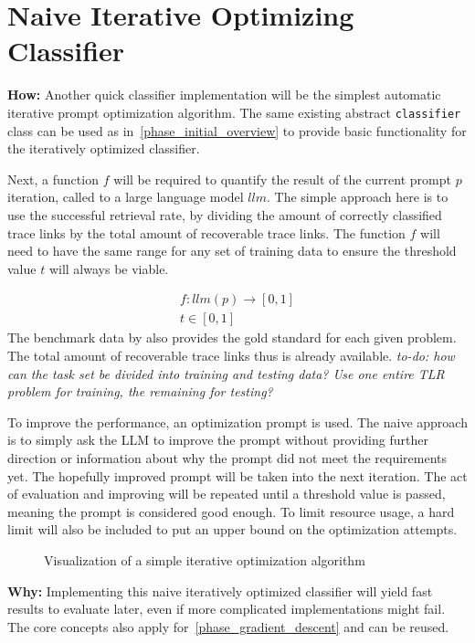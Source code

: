 \section{Naive Iterative Optimizing Classifier}
\label{approach:sec:naive_iterative}
\textbf{How:} Another quick classifier implementation will be the simplest automatic iterative prompt optimization algorithm. The same existing abstract \verb|classifier| class can be used as in~\ref{phase_initial_overview} to provide basic functionality for the iteratively optimized classifier.

Next, a function $f$ will be required to quantify the result of the current prompt $p$ iteration, called to a large language model $llm$. The simple approach here is to use the successful retrieval rate, by dividing the amount of correctly classified trace links by the total amount of recoverable trace links.
The function $f$ will need to have the same range for any set of training data to ensure the threshold value $t$ will always be viable.


\begin{align*} 
f: llm(p) \rightarrow [0, 1] \\
t \in [0, 1]
\end{align*}
The benchmark data by  also provides the gold standard for each given problem. The total amount of recoverable trace links thus is already available. \textit{to-do: how can the task set be divided into training and testing data? Use one entire TLR problem for training, the remaining for testing?}

To improve the performance, an optimization prompt is used. The naive approach is to simply ask the LLM to improve the prompt without providing further direction or information about why the prompt did not meet the requirements yet. The hopefully improved prompt will be taken into the next iteration. The act of evaluation and improving will be repeated until a threshold value is passed, meaning the prompt is considered good enough. To limit resource usage, a hard limit will also be included to put an upper bound on the optimization attempts.

\begin{figure}
    \centering
    
    \caption{Visualization of a simple iterative optimization algorithm}
    \label{fig:iterative_core_loop}
\end{figure}

\textbf{Why:} Implementing this naive iteratively optimized classifier will yield fast results to evaluate later, even if more complicated implementations might fail. The core concepts also apply for~\ref{phase_gradient_descent} and can be reused.


